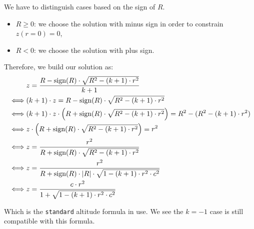 We have to distinguish cases based on the sign of $R$.
\begin{itemize}
\item $R \geq 0$: we choose the solution with minus sign in order to constrain
                  $z(r=0)=0$,
\item $R < 0$: we choose the solution with plus sign.
\end{itemize}

Therefore, we build our solution as:
\begin{equation} \begin{split}
& z = \frac{R - \textrm{sign}(R) \cdot \sqrt{R^2 - (k+1) \cdot r^2}}{k+1} \\
\iff & (k+1) \cdot z = R - \textrm{sign}(R) \cdot \sqrt{R^2 - (k+1) \cdot r^2}\\
\iff & (k+1) \cdot z \cdot \left( R + \textrm{sign}(R) \cdot
       \sqrt{R^2 - (k+1) \cdot r^2} \right) = R^2 - (R^2 - (k+1) \cdot r^2) \\
\iff & z \cdot \left( R + \textrm{sign}(R) \cdot
       \sqrt{R^2 - (k+1) \cdot r^2} \right) = r^2 \\
\iff & z = \frac{r^2}{R + \textrm{sign}(R) \cdot \sqrt{R^2 - (k+1) \cdot r^2}}\\
\iff & z = \frac{r^2}{R + \textrm{sign}(R) \cdot \abs{R} \cdot
                      \sqrt{1 - (k+1) \cdot r^2 \cdot c^2}} \\
\iff & z = \frac{c \cdot r^2}{1 + \sqrt{1 - (k+1) \cdot r^2 \cdot c^2}}
\end{split} \end{equation}

Which is the \lstinline{standard} altitude formula in use. We see the $k=-1$
case is still compatible with this formula.

